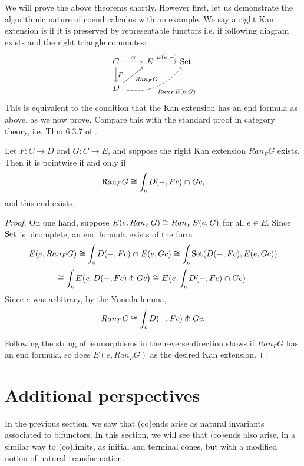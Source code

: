 We will prove the above theorems shortly. However first, let us demonstrate the algorithmic nature of coend calculus with an example. We say a right Kan extension is  if it is preserved by representable functors i.e. if following diagram exists and the right triangle commutes:
\[\begin{tikzcd}
C \arrow[d, "F"] \arrow[r, "G"]                                            & E \arrow[r, "{E(e,-)}"] & \Set \\
D \arrow[ru, "Ran_FG"'] \arrow[rru, "{Ran_F E(e,G)}"', dashed, bend right] &                         &    
\end{tikzcd}\]
This is equivalent to the condition that the Kan extension has an end formula as above, as we now prove. Compare this with the standard proof in category theory, i.e. Thm 6.3.7 of \cite{Riehl}.

\begin{proposition}
Let $F:C\rightarrow D$ and $G:C\rightarrow E$, and suppose the right Kan extension $Ran_FG$ exists. Then it is pointwise if and only if $$\text{Ran}_FG\cong \int_c D(-,Fc)\pitchfork Gc,$$ and this end exists.
\end{proposition}
\begin{proof}
    On one hand, suppose $E(e,Ran_FG)\cong Ran_FE(e,G)$ for all $e\in E.$ Since ${\text{Set}}$ is bicomplete, an end formula exists of the form 
    $$E(e,Ran_FG)\cong \int_{c} D(-,Fc)\pitchfork E(e,Gc)\cong \int_c {\text{Set}}(D(-,Fc),E(e,Gc))$$
    $$\cong \int_cE\big(e,D(-,Fc)\pitchfork Gc\big)\cong E\big(e,\int_cD(-,Fc)\pitchfork Gc\big).$$
    Since $e$ was arbitrary, by the Yoneda lemma, $$Ran_FG\cong \int_cD(-,Fc)\pitchfork Gc.$$

    Following the string of isomorphisms in the reverse direction shows if $Ran_FG$ has an end formula, so does $E(e,Ran_FG)$ as the desired Kan extension.
\end{proof}

\section{Additional perspectives}\label{sec:dinatural-transformations}
In the previous section, we saw that (co)ends arise as natural invariants associated to bifunctors. In this section, we will see that (co)ends also arise, in a similar way to (co)limits, as initial and terminal cones, but with a modified notion of natural transformation.

